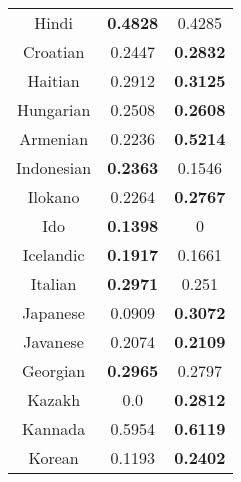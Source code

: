 \begin{figure}[h]
\begin{tabular}{ccc}
Hindi&\textbf{0.4828}&0.4285\\
Croatian&0.2447&\textbf{0.2832}\\
Haitian&0.2912&\textbf{0.3125}\\
Hungarian&0.2508&\textbf{0.2608}\\
Armenian&0.2236&\textbf{0.5214}\\
Indonesian&\textbf{0.2363}&0.1546\\
Ilokano&0.2264&\textbf{0.2767}\\
Ido&\textbf{0.1398}&0\\
Icelandic&\textbf{0.1917}&0.1661\\
Italian&\textbf{0.2971}&0.251\\
Japanese&0.0909&\textbf{0.3072}\\
Javanese&0.2074&\textbf{0.2109}\\
Georgian&\textbf{0.2965}&0.2797\\
Kazakh&0.0&\textbf{0.2812}\\
Kannada&0.5954&\textbf{0.6119}\\
Korean&0.1193&\textbf{0.2402}\\
\end{tabular}
\end{figure}
